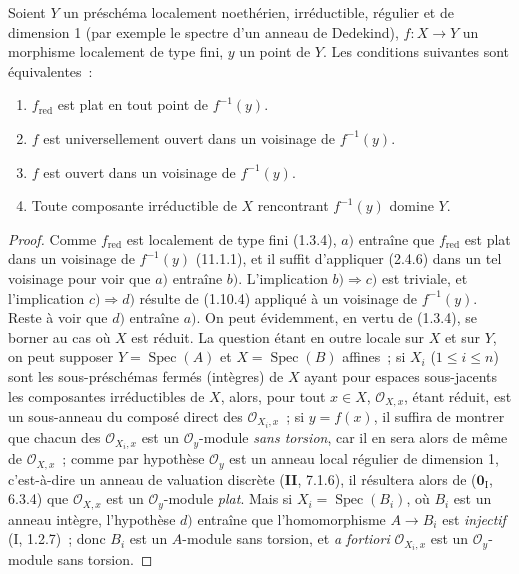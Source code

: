 \begin{proposition}[14.3.8]
\label{IV.14.3.8-fr}
Soient $Y$ un préschéma localement noethérien, irréductible, régulier et de
dimension 1 (par exemple le spectre d'un anneau de Dedekind), $f:X\to Y$ un
morphisme localement de type fini, $y$ un point de $Y$. Les conditions suivantes
sont équivalentes~:
\begin{enumerate}[label=\emph{\alph*)}]
  \item $f_{\mathrm{red}}$ est plat en tout point de $f^{-1}(y)$.
  \item $f$ est universellement ouvert dans un voisinage de $f^{-1}(y)$.
  \item $f$ est ouvert dans un voisinage de $f^{-1}(y)$.
  \item Toute composante irréductible de $X$ rencontrant $f^{-1}(y)$ domine $Y$.
\end{enumerate}
\end{proposition}

\begin{proof}
Comme $f_{\mathrm{red}}$ est localement de type fini (1.3.4), $a)$ entraîne que
$f_{\mathrm{red}}$ est plat dans un voisinage de $f^{-1}(y)$ (11.1.1), et il
suffit d'appliquer (2.4.6) dans un tel voisinage pour voir que $a)$ entraîne $b)$.
L'implication $b)\Rightarrow c)$ est triviale, et l'implication
$c)\Rightarrow d)$ résulte de (1.10.4) appliqué à un voisinage de $f^{-1}(y)$.
Reste à voir que $d)$ entraîne $a)$. On peut évidemment, en vertu de (1.3.4), se
borner au cas où $X$ est réduit. La question étant en outre locale sur $X$ et sur
$Y$, on peut supposer $Y=\operatorname{Spec}(A)$ et
$X=\operatorname{Spec}(B)$
affines~; si $X_i$ ($1\leq i\leq n$) sont les sous-préschémas fermés (intègres)
de $X$ ayant pour espaces sous-jacents les composantes irréductibles de $X$,
alors, pour tout $x\in X$, $\mathcal O_{X,x}$, étant réduit, est un sous-anneau du
composé direct des $\mathcal O_{X_i,x}$~; si $y=f(x)$, il suffira de montrer que
chacun des $\mathcal O_{X_i,x}$ est un $\mathcal O_y$-module \emph{sans torsion},
car il en sera alors de même de $\mathcal O_{X,x}$~; comme par hypothèse
$\mathcal O_y$ est un anneau local régulier de dimension 1, c'est-à-dire un anneau
de valuation discrète (\textbf{II}, 7.1.6), il résultera alors de
($\mathbf{0}_{\mathrm I}$, 6.3.4) que $\mathcal O_{X,x}$ est un
$\mathcal O_y$-module \emph{plat}. Mais si $X_i=\operatorname{Spec}(B_i)$, où
$B_i$ est un anneau intègre, l'hypothèse $d)$ entraîne que l'homomorphisme
$A\to B_i$ est \emph{injectif} (I, 1.2.7)~; donc $B_i$ est un $A$-module sans
torsion, et \emph{a fortiori} $\mathcal O_{X_i,x}$ est un $\mathcal O_y$-module
sans torsion.
\end{proof}

